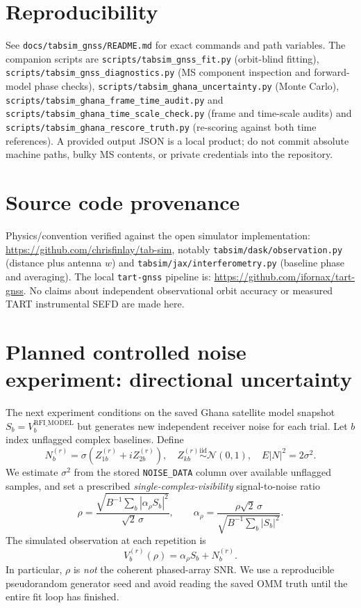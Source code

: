\documentclass[11pt,a4paper]{article}
\begin{document}
\section{Reproducibility}
See \texttt{docs/tabsim\_gnss/README.md} for exact commands and path variables.
The companion scripts are \texttt{scripts/tabsim\_gnss\_fit.py}
(orbit-blind fitting), \texttt{scripts/tabsim\_gnss\_diagnostics.py}
(MS component inspection and forward-model phase checks),
\texttt{scripts/tabsim\_ghana\_uncertainty.py} (Monte Carlo),
\texttt{scripts/tabsim\_ghana\_frame\_time\_audit.py} and
\texttt{scripts/tabsim\_ghana\_time\_scale\_check.py} (frame and
time-scale audits) and \texttt{scripts/tabsim\_ghana\_rescore\_truth.py}
(re-scoring against both time references).
A provided output JSON is a local product; do not commit absolute machine
paths, bulky MS contents, or private credentials into the repository.
\section{Source code provenance}
Physics/convention verified against the open simulator implementation:
\url{https://github.com/chrisfinlay/tab-sim},
notably \texttt{tabsim/dask/observation.py} (distance plus antenna $w$)
and \texttt{tabsim/jax/interferometry.py} (baseline phase and averaging).
The local \texttt{tart-gnss} pipeline is:
\url{https://github.com/ifornax/tart-gnss}.
No claims about independent observational orbit accuracy or measured
TART instrumental SEFD are made here.

\section{Planned controlled noise experiment: directional uncertainty}
\label{sec:uncertainty}
The next experiment conditions on the saved Ghana satellite model snapshot
$S_b=V_b^{\mathrm{RFI\_MODEL}}$ but generates new independent receiver
noise for each trial. Let $b$ index unflagged complex baselines. Define
\begin{equation}
N_b^{(r)}=\sigma(Z_{1b}^{(r)}+iZ_{2b}^{(r)}),
\quad Z_{kb}^{(r)}\overset{\mathrm{iid}}{\sim}\mathcal N(0,1),
\quad E|N|^2=2\sigma^2.
\end{equation}
We estimate $\sigma^2$ from the stored \texttt{NOISE\_DATA} column
over available unflagged samples, and set a prescribed
\emph{single-complex-visibility} signal-to-noise ratio
\begin{equation}
\rho=\frac{\sqrt{B^{-1}\sum_b|\alpha_\rho S_b|^2}}
{\sqrt2\,\sigma},\qquad
\alpha_\rho=\frac{\rho\sqrt2\,\sigma}
{\sqrt{B^{-1}\sum_b|S_b|^2}}.
\end{equation}
The simulated observation at each repetition is
\begin{equation}
V_b^{(r)}(\rho)=\alpha_\rho S_b + N_b^{(r)}.
\end{equation}
In particular, $\rho$ is \emph{not} the coherent phased-array SNR.
We use a reproducible pseudorandom generator seed and avoid reading
the saved OMM truth until the entire fit loop has finished.
\end{document}
